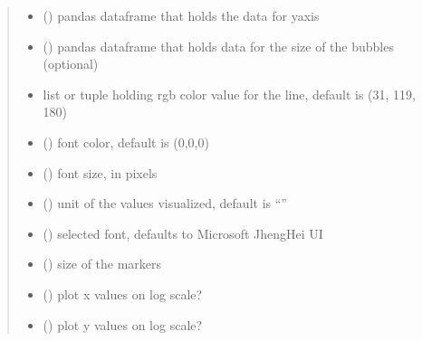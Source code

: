 \documentclass[letterpaper,10pt,english]{sphinxmanual}
\begin{document}
\begin{fulllineitems}
\begin{quote}
\begin{description}
\begin{itemize}
\item {} 
\sphinxAtStartPar
{} () \textendash{} pandas dataframe that holds the data for y\sphinxhyphen{}axis

\item {} 
\sphinxAtStartPar
{} () \textendash{} pandas dataframe that holds data for the size of the bubbles (optional)

\item {} 
\sphinxAtStartPar
{} \textendash{} list or tuple holding rgb color value for the line, default is (31, 119, 180)

\item {} 
\sphinxAtStartPar
{} () \textendash{} font color, default is (0,0,0)

\item {} 
\sphinxAtStartPar
{} () \textendash{} font size, in pixels

\item {} 
\sphinxAtStartPar
{} () \textendash{} unit of the values visualized, default is “”

\item {} 
\sphinxAtStartPar
{} () \textendash{} selected font, defaults to Microsoft JhengHei UI

\item {} 
\sphinxAtStartPar
{} () \textendash{} size of the markers

\item {} 
\sphinxAtStartPar
{} () \textendash{} plot x values on log scale?

\item {} 
\sphinxAtStartPar
{} () \textendash{} plot y values on log scale?


\end{itemize}
\end{description}
\end{quote}
\end{fulllineitems}
\end{document}
